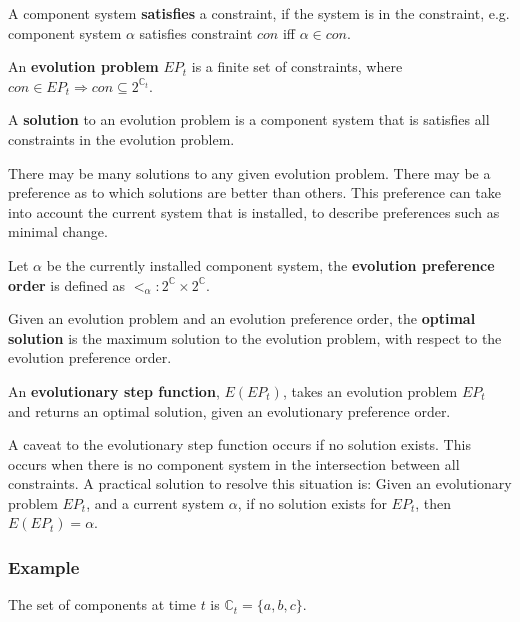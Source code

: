 \begin{defs}
\label{formal.constraintdefs}
A component system \textbf{satisfies} a constraint, if the system is in the constraint, e.g. component system $\alpha$ satisfies constraint $con$ iff $\alpha \in con$.
\end{defs}

\begin{defs}
An \textbf{evolution problem} $EP_t$ is a finite set of constraints, where $con \in EP_t \Rightarrow con \subseteq 2^{\mathbb{C}_t}$.
\end{defs}

\begin{defs}
A \textbf{solution} to an evolution problem is a component system that is satisfies all constraints in the evolution problem.  
\end{defs}

There may be many solutions to any given evolution problem.
There may be a preference as to which solutions are better than others.
This preference can take into account the current system that is installed, to describe preferences such as minimal change.
\begin{defs}
Let $\alpha$ be the currently installed component system, 
the \textbf{evolution preference order} is defined as $<_{\alpha}: 2^{\mathbb{C}} \times 2^{\mathbb{C}}$.
\end{defs}

\begin{defs}
Given an evolution problem and an evolution preference order, 
the \textbf{optimal solution} is the maximum solution to the evolution problem, with respect to the evolution preference order.
\end{defs}

\begin{defs}
An \textbf{evolutionary step function}, $E(EP_t)$, takes an evolution problem $EP_t$ and returns an optimal solution, given an evolutionary preference order.
\end{defs}

A caveat to the evolutionary step function occurs if no solution exists.
This occurs when there is no component system in the intersection between all constraints.
A practical solution to resolve this situation is:
Given an evolutionary problem $EP_t$, and a current system $\alpha$, if no solution exists for $EP_t$, then $E(EP_t) = \alpha$.

\subsubsection{Example}
The set of components at time $t$ is $\mathbb{C}_t = \{a,b,c\}$.

